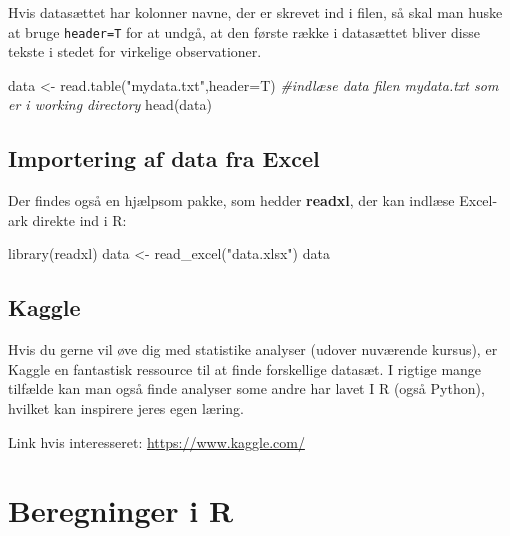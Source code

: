 \documentclass[
]{book}
\newenvironment{Shaded}{\begin{snugshade}}{\end{snugshade}}
\newcommand{\AttributeTok}[1]{\textcolor[rgb]{0.77,0.63,0.00}{#1}}
\newcommand{\CommentTok}[1]{\textcolor[rgb]{0.56,0.35,0.01}{\textit{#1}}}
\newcommand{\FunctionTok}[1]{\textcolor[rgb]{0.00,0.00,0.00}{#1}}
\newcommand{\NormalTok}[1]{#1}
\newcommand{\OtherTok}[1]{\textcolor[rgb]{0.56,0.35,0.01}{#1}}
\newcommand{\StringTok}[1]{\textcolor[rgb]{0.31,0.60,0.02}{#1}}
\begin{document}
Hvis datasættet har kolonner navne, der er skrevet ind i filen, så skal man huske at bruge \texttt{header=T} for at undgå, at den første række i datasættet bliver disse tekste i stedet for virkelige observationer.

\begin{Shaded}
\begin{Highlighting}[]
\NormalTok{data }\OtherTok{\textless{}{-}} \FunctionTok{read.table}\NormalTok{(}\StringTok{"mydata.txt"}\NormalTok{,}\AttributeTok{header=}\NormalTok{T) }\CommentTok{\#indlæse data filen mydata.txt som er i working directory}
\FunctionTok{head}\NormalTok{(data)}
\end{Highlighting}
\end{Shaded}

\hypertarget{importering-af-data-fra-excel}{%
\subsection{Importering af data fra Excel}\label{importering-af-data-fra-excel}}

Der findes også en hjælpsom pakke, som hedder \textbf{readxl}, der kan indlæse Excel-ark direkte ind i R:

\begin{Shaded}
\begin{Highlighting}[]
\FunctionTok{library}\NormalTok{(readxl)}
\NormalTok{data }\OtherTok{\textless{}{-}} \FunctionTok{read\_excel}\NormalTok{(}\StringTok{"data.xlsx"}\NormalTok{)}
\NormalTok{data}
\end{Highlighting}
\end{Shaded}

\hypertarget{kaggle}{%
\subsection{Kaggle}\label{kaggle}}

Hvis du gerne vil øve dig med statistike analyser (udover nuværende kursus), er Kaggle en fantastisk ressource til at finde forskellige datasæt. I rigtige mange tilfælde kan man også finde analyser some andre har lavet I R (også Python), hvilket kan inspirere jeres egen læring.

Link hvis interesseret: \url{https://www.kaggle.com/}

\hypertarget{beregninger-i-r}{%
\section{Beregninger i R}\label{beregninger-i-r}}
\end{document}
